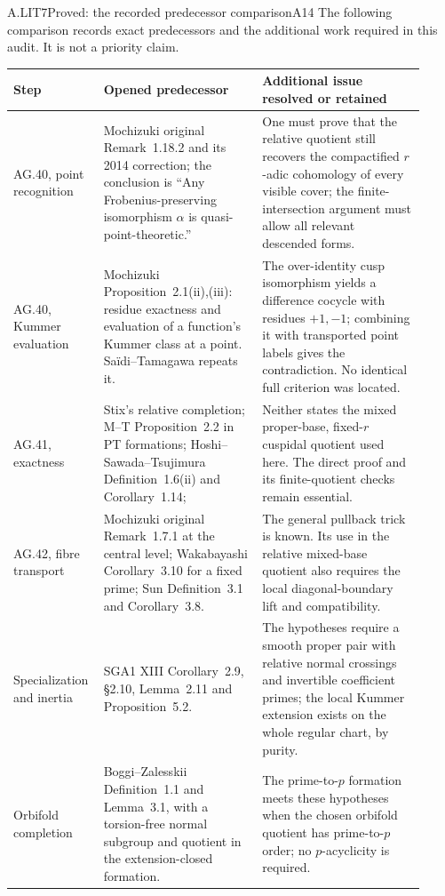 \begin{claim}{A.LIT7}{Proved: the recorded predecessor comparison}{A14}
The following comparison records exact predecessors and the additional
work required in this audit. It is not a priority claim.
\end{claim}
\begin{center}\small
\begin{longtable}{p{0.17\linewidth}p{0.37\linewidth}p{0.38\linewidth}}
\toprule
Step&Opened predecessor&Additional issue resolved or retained\\\midrule
AG.40, point recognition&
Mochizuki original Remark~1.18.2 and its 2014 correction; the conclusion
is ``Any Frobenius-preserving isomorphism $\alpha$ is quasi-point-theoretic.''&
One must prove that the relative quotient still recovers the compactified
$r$-adic cohomology of every visible cover; the finite-intersection
argument must allow all relevant descended forms.\\
AG.40, Kummer evaluation&
Mochizuki Proposition~2.1(ii),(iii): residue exactness and evaluation of
a function's Kummer class at a point. Sa\"idi--Tamagawa repeats it.&
The over-identity cusp isomorphism yields a difference cocycle with
residues $+1,-1$; combining it with transported point labels gives the
contradiction. No identical full criterion was located.\\
AG.41, exactness&
Stix's relative completion; M--T Proposition~2.2 in PT formations;
Hoshi--Sawada--Tsujimura Definition~1.6(ii) and Corollary~1.14;&
Neither states the mixed proper-base, fixed-$r$ cuspidal quotient used
here. The direct proof and its finite-quotient checks remain essential.\\
AG.42, fibre transport&
Mochizuki original Remark~1.7.1 at the central level; Wakabayashi
Corollary~3.10 for a fixed prime; Sun Definition~3.1 and Corollary~3.8.&
The general pullback trick is known. Its use in the relative mixed-base
quotient also requires the local diagonal-boundary lift and compatibility.\\
Specialization and inertia&
SGA1 XIII Corollary~2.9, \S2.10, Lemma~2.11 and Proposition~5.2.&
The hypotheses require a smooth proper pair with relative normal crossings
and invertible coefficient primes; the local Kummer extension exists on
the whole regular chart, by purity.\\
Orbifold completion&
Boggi--Zalesskii Definition~1.1 and Lemma~3.1, with a torsion-free normal
subgroup and quotient in the extension-closed formation.&
The prime-to-$p$ formation meets these hypotheses when the chosen
orbifold quotient has prime-to-$p$ order; no $p$-acyclicity is required.\\
\bottomrule
\end{longtable}
\end{center}
